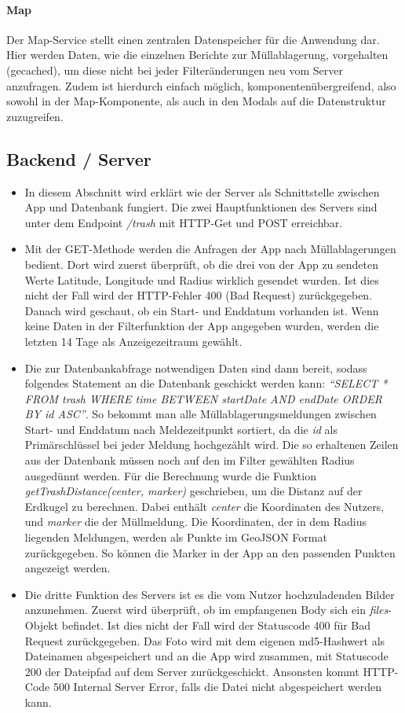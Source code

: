 \documentclass[a4paper, 11pt, DIV=11, listof=numbered, numbers=noenddot]{scrartcl}
\begin{document}
	\paragraph{Map}
	Der Map-Service stellt einen zentralen Datenspeicher für die Anwendung dar. Hier werden Daten, wie die einzelnen Berichte zur Müllablagerung, vorgehalten (gecached), um diese nicht bei jeder Filteränderungen neu vom Server anzufragen.
	Zudem ist hierdurch einfach möglich, komponentenübergreifend, also sowohl in der Map-Komponente, als auch in den Modals auf die Datenstruktur zuzugreifen.
	
	\subsection{Backend / Server}
	\begin{itemize}
		\item In diesem Abschnitt wird erklärt wie der Server als Schnittstelle zwischen App und Datenbank fungiert. Die zwei Hauptfunktionen des Servers sind unter dem Endpoint \textit{/trash} mit HTTP-Get und POST erreichbar.
		\item Mit der GET-Methode werden die Anfragen der App nach Müllablagerungen bedient. Dort wird zuerst überprüft, ob die drei von der App zu sendeten Werte Latitude, Longitude und Radius wirklich gesendet wurden. Ist dies nicht der Fall wird der HTTP-Fehler 				400 (Bad Request) zurückgegeben. Danach wird geschaut, ob ein Start- und Enddatum vorhanden ist. Wenn keine Daten in der Filterfunktion der App angegeben wurden, werden die letzten 14 Tage als Anzeigezeitraum gewählt.
		\item Die zur Datenbankabfrage notwendigen Daten sind dann bereit, sodass folgendes Statement an die Datenbank geschickt werden kann:\textit{ “SELECT * FROM trash WHERE time BETWEEN startDate AND endDate ORDER BY id ASC”}. So bekommt man alle 				Müllablagerungsmeldungen zwischen Start- und Enddatum nach Meldezeitpunkt sortiert, da die \textit {id} als Primärschlüssel bei jeder Meldung hochgezählt wird.
			Die so erhaltenen Zeilen aus der Datenbank müssen noch auf den im Filter gewählten Radius ausgedünnt werden. Für die Berechnung wurde die Funktion \textit{getTrashDistance(center, marker)} geschrieben, um die Distanz auf der Erdkugel zu berechnen. 				Dabei enthält \textit{center} die Koordinaten des Nutzers, und \textit{marker} die der Müllmeldung. Die Koordinaten, der in dem Radius liegenden Meldungen, werden als Punkte im GeoJSON Format zurückgegeben. So können die Marker in der App an den 				passenden Punkten angezeigt werden.
		\item Die dritte Funktion des Servers ist es die vom Nutzer hochzuladenden Bilder anzunehmen. Zuerst wird überprüft, ob im empfangenen Body sich ein \textit{files}-Objekt befindet. Ist dies nicht der Fall wird der Statuscode 400 für Bad Request 							zurückgegeben. Das Foto wird mit dem eigenen md5-Hashwert als Dateinamen abgespeichert und an die App wird zusammen, mit Statuscode 200 der Dateipfad auf dem Server zurückgeschickt. Ansonsten kommt HTTP-Code 500 Internal Server Error, falls die 				Datei nicht abgespeichert werden kann.
	\end{itemize}
\end{document}
